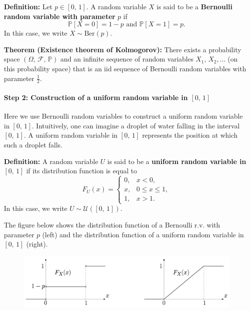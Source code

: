\documentclass[a4paper]{extarticle}
\begin{document}
\textbf{Definition:} Let \(p \in [0, \, 1]\). A random variable \(X\) is said to be a \textbf{Bernoulli random variable with parameter} \(p\) if
\[
    \mathbb{P}[X = 0] = 1 - p \text{ and } \mathbb{P}[X = 1] = p.
\]
In this case, we write \(X \sim \text{Ber}(p)\).

\begin{tbox}
    \textbf{Theorem (Existence theorem of Kolmogorov):} There exists a probability space \((\Omega, \, \mathcal{F}, \, \mathbb{P})\) and an infinite sequence of random variables \(X_1, \, X_2,...\) (on this probability space) that is an iid sequence of Bernoulli random variables with parameter \(\frac{1}{2}\).
\end{tbox}

\paragraph{Step 2: Construction of a uniform random variable in \([0, \, 1]\)}
Here we use Bernoulli random variables to construct a uniform random variable in \([0, \, 1]\). Intuitively, one can imagine a droplet of water falling in the interval \([0, \, 1]\). A uniform random variable in \([0, \, 1]\) represents the position at which such a droplet falls.

\textbf{Definition:} A random variable \(U\) is said to be a \textbf{uniform random variable in} \([0, \, 1]\) if its distribution function is equal to
\[
    F_U(x) = \begin{cases}
        0, &x < 0, \\
        x, &0 \leq x \leq 1, \\
        1, &x > 1.
    \end{cases}
\]
In this case, we write \(U \sim \mathcal{U}([0, \, 1])\).

The figure below shows the distribution function of a Bernoulli r.v. with parameter \(p\) (left) and the distribution function of a uniform random variable in \([0, \, 1]\) (right).

\begin{figure}[H]
    \includegraphics[width=15cm]{../images/WuS_Fig3-1}
    \centering
\end{figure}
\end{document}
